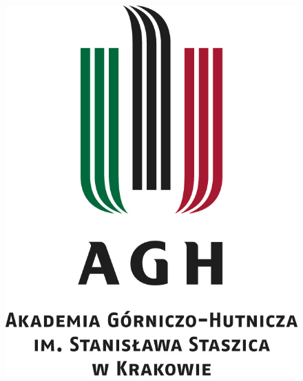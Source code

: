 \documentclass[a4paper,11pt]{article}
\begin{document}
\renewcommand*{\figurename}{{\small Rys.}}

\begin{figure}[!htb]
	\centerline{\includegraphics[scale=1]{agh_logo.jpg}}
\end{figure}
\end{document}
